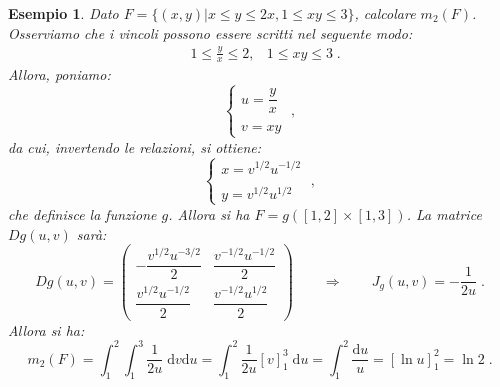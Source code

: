 \documentclass[a4paper,12pt]{report}
\theoremstyle{plain}
\newtheorem{exm}{Esempio}[section]
\theoremstyle{definition}
\theoremstyle{remark}
\newcommand{\diff}[1]{\mathrm{d}#1}
\numberwithin{equation}{section}
\begin{document}
\begin{exm} Dato $F=\{(x,y)|x\le y\le 2x,1\le xy\le 3\}$, calcolare $m_2(F)$. \\

Osserviamo che i vincoli possono essere scritti nel seguente modo:
\begin{align}
&1\le \frac{y}{x}\le 2, &1\le xy\le 3\;.
\end{align}
Allora, poniamo:
\begin{equation}
\begin{cases}
 u=\dfrac{y}{x} \\
\\
v=xy
\end{cases}\;,
\end{equation}
da cui, invertendo le relazioni, si ottiene:
\begin{equation}
\begin{cases}
 x=v^{1/2}u^{-1/2} \\
\\
y=v^{1/2}u^{1/2}
\end{cases}\;,
\end{equation}
che definisce la funzione $g$. Allora si ha $F=g([1,2]\times[1,3])$. La matrice $Dg(u,v)$ sarà:
\begin{equation}
Dg(u,v)=\begin{pmatrix}
               -\dfrac{v^{1/2}u^{-3/2}}{2} & \dfrac{v^{-1/2}u^{-1/2}}{2} \\
\dfrac{v^{1/2}u^{-1/2}}{2} & \dfrac{v^{-1/2}u^{1/2}}{2}
              \end{pmatrix}\qquad \Longrightarrow\qquad  J_g(u,v)=-\frac{1}{2u}\;.
\end{equation}
Allora si ha:
\begin{equation}
m_2(F)=\int_1^2\int_1^3\frac{1}{2u}\;\diff{v}\diff{u}=\int_1^2\frac{1}{2u}[v]^3_1\;\diff{u}=\int_1^2 \frac{\diff{u}}{u}=[\ln u]^2_1=\ln 2\;.
\end{equation}
\end{exm}
\end{document}

